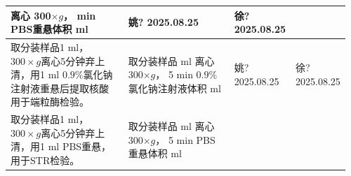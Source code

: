\documentclass[UTF8,10pt,a4paper,fontset=fandol]{ctexart}
\newcommand{\fieldvalue}[1]{#1}
\newcommand{\handwritten}[1]{#1}
\begin{document}
\begin{tabular}{|p{0.36\linewidth}|p{0.32\linewidth}|p{0.14\linewidth}|p{0.14\linewidth}|}
离心
\fieldvalue{\handwritten{300}}$\times g$，\underline{\hspace{0.7cm}} min\newline
PBS重悬体积 \underline{\hspace{0.8cm}} ml
&
\fieldvalue{\handwritten{姚?}}\newline
\fieldvalue{\handwritten{2025.08.25}}
&
\fieldvalue{\handwritten{徐?}}\newline
\fieldvalue{\handwritten{2025.08.25}}
\\ \hline
取分装样品1 ml，$300\times g$离心5分钟弃上清，用1 ml $0.9\%$氯化钠注射液重悬后提取核酸用于端粒酶检验。&
取分装样品 \underline{\hspace{1cm}} ml\newline
离心
\fieldvalue{\handwritten{300}}$\times g$，
\fieldvalue{\handwritten{5}} min\newline
$0.9\%$氯化钠注射液体积 \underline{\hspace{0.8cm}} ml
&
\fieldvalue{\handwritten{姚?}}\newline
\fieldvalue{\handwritten{2025.08.25}}
&
\fieldvalue{\handwritten{徐?}}\newline
\fieldvalue{\handwritten{2025.08.25}}
\\ \hline
取分装样品1 ml，$300\times g$离心5分钟弃上清，用1 ml PBS重悬，用于STR检验。&
取分装样品 \underline{\hspace{1cm}} ml\newline
离心
\fieldvalue{\handwritten{300}}$\times g$，
\fieldvalue{\handwritten{5}} min\newline
PBS重悬体积 \underline{\hspace{0.8cm}} ml

\end{tabular}
\end{document}
